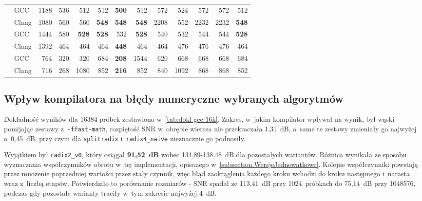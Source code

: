 \begin{table}[H]
\begin{tabular}{llrrrrrrrrrrr}
\addlinespace
\multirow{2}{*}{radix4\_naive}
  & GCC   & 1188 & 536 & 512  & 512  & \textbf{500} & 512  & 572  & 524  & 572  & 572  & 512 \\
  & Clang & 1080 & 560 & 560  & \textbf{548}  & \textbf{548} & \textbf{548}  & 2208 & 552  & 2232 & 2232 & \textbf{548} \\
\addlinespace
\multirow{2}{*}{splitradix}
  & GCC   & 1444 & 580 & \textbf{528}  & \textbf{528}  & 532 & \textbf{528}  & 540  & 532  & 544  & 544  & \textbf{528} \\
  & Clang & 1392 & 464 & 464  & 464  & \textbf{448} & 464  & 464  & 476  & 476  & 476  & 464 \\
\addlinespace
\multirow{2}{*}{stockham}
  & GCC   & 764  & 320 & 320  & 684  & \textbf{208} & 1544 & 620  & 668  & 668  & 668  & 684 \\
  & Clang & 716  & 268 & 1080 & 852  & \textbf{216} & 852  & 840  & 1092 & 868  & 868  & 852 \\
\bottomrule
\end{tabular}
\end{table}



\subsection{Wpływ kompilatora na błędy numeryczne wybranych algorytmów}\label{sec:WplywBledyNumeryczne}
Dokładność wyników dla 16384 próbek zestawiono w~\cref{tab:dokl-gcc-16k}. Zakres,
w~jakim kompilator wpływał na wynik, był wąski - pomijając zestawy
z~\texttt{-ffast-math}, rozpiętość SNR w~obrębie wiersza nie przekraczała 1,31~dB,
a~same te zestawy zmieniały go najwyżej o~0,45~dB, przy czym dla
\texttt{splitradix} i~\texttt{radix4\_naive} nieznacznie go podnosiły.

Wyjątkiem był \texttt{radix2\_v0}, który osiągał \textbf{91,52~dB} wobec 134,89-138,48~dB
dla pozostałych wariantów. Różnica wynikała ze sposobu wyznaczania współczynników
obrotu w~tej implementacji, opisanego
w~\cref{subsection:WersjeJednowatkowe}. Kolejne
współczynniki powstają przez mnożenie poprzedniej wartości przez stały czynnik,
więc błąd zaokrąglenia każdego kroku wchodzi do kroku następnego i~narasta wraz
z~liczbą etapów. Potwierdziło to porównanie rozmiarów - SNR spadał ze 113,41~dB
przy 1024~próbkach do 75,14~dB przy 1048576, podczas gdy pozostałe warianty traciły
w~tym zakresie najwyżej 4~dB.

